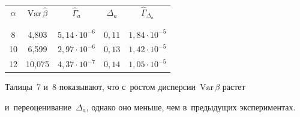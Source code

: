 \begin{table}\small %


\begin{center}


\parbox{216pt}{





}





\vspace*{2ex}





\begin{tabular}{|c|c|c|c|c|}


\hline


$\alpha$& $\mathrm{Var}\, \hat{\beta}$ &  ${\hat\Gamma}_{a}$  & ${\Delta}_{a}$ & 


${\hat\Gamma}_{{\Delta}_{a}}$ \\ 


&&&&\\[-9pt] 


\hline


&&&&\\[-9pt] 


 \hphantom{9}8 & 4,803 &  $5{,}14\cdot 10^{-6} $&  $0{,}11$ & $1{,}84 \cdot 10^{-5}$  \\


 10& 6,599& $2{,}97 \cdot 10^{-6} $&  $0{,}13$ & $1{,}42 \cdot 10^{-5} $\\




 12&10,075\hphantom{9}&$ 4{,}37 \cdot 10^{-7}$ & $0{,}14$ & $1{,}05 \cdot 10^{-5}$  \\


\hline


\end{tabular}


\end{center}


\vspace*{-9pt}


\end{table}


Талицы~7 и~8  показывают, что с~ростом дисперсии~$\mathrm{Var}\,\beta$ растет


 и~переоценивание~${\Delta}_{a}$, однако оно   меньше, чем в~предыдущих экспериментах.





